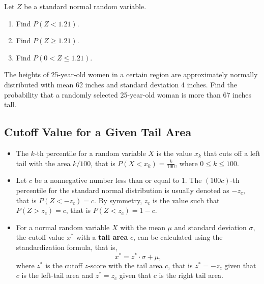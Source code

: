 \begin{example}

Let \(Z\) be a standard normal random variable.

\begin{enumerate}
\item
  Find \(P(Z<1.21)\).
\item
  Find \(P(Z\geq 1.21)\).
\item
  Find \(P(0<Z\leq 1.21)\).
\end{enumerate}

\end{example}

\begin{example}

The heights of 25-year-old women in a certain region are approximately
normally distributed with mean 62 inches and standard deviation 4
inches. Find the probability that a randomly selected 25-year-old woman
is more than 67 inches tall.

\end{example}
\vspace*{5\baselineskip}

\hypertarget{cutoff-value-for-a-given-tail-area}{%
\subsection{Cutoff Value for a Given Tail
Area}\label{cutoff-value-for-a-given-tail-area}}

\begin{itemize}
\item
  The \(k\)-th percentile for a random variable \(X\) is the value
  \(x_k\) that cuts off a left tail with the area \(k/100\), that is
  \(P(X<x_k)=\frac{k}{100}\), where \(0\leq k\leq 100\).
\item
  Let \(c\) be a nonnegative number less than or equal to 1. The
  \((100c)\)-th percentile for the standard normal distribution is
  usually denoted as \(-z_c\), that is \(P(Z<-z_c)=c\). By symmetry,
  \(z_c\) is the value such that \(P(Z> z_c)=c\), that is
  \(P(Z<z_c)=1-c\).
\item
  For a normal random variable \(X\) with the mean \(\mu\) and standard
  deviation \(\sigma\), the cutoff value \(x^*\) with a \textbf{tail
  area} \(c\), can be calculated using the standardization formula, that
  is, \[x^*=z^*\cdot \sigma+\mu,\] where \(z^*\) is the cutoff
  \(z\)-score with the tail area \(c\), that is \(z^*=-z_c\) given that
  \(c\) is the left-tail area and \(z^*=z_c\) given that \(c\) is the
  right tail area.
\end{itemize}

